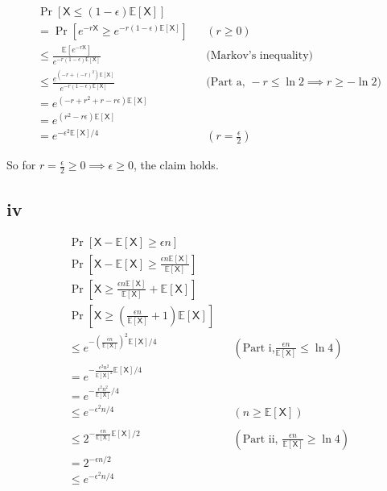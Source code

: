\documentclass{article}
\newcommand{\E}{\mathbb{E}}
\newcommand{\rX}{\mathsf{X}}
\begin{document}
\begin{align}
    \Pr[\rX \leq (1-\epsilon)\E[\rX]]  \\
    = \Pr[e^{-r\rX} \geq e^{-r(1-\epsilon)\E[\rX]}] && (r \geq 0) \\
    \leq \frac{\E[e^{-r\rX}]}{e^{-r(1-\epsilon)\E[\rX]}} && \text{(Markov's inequality)} \\
    \leq \frac{e^{(-r+(-r)^2)\E[\rX]}}{e^{-r(1-\epsilon)\E[\rX]}} && \text{({Part
    a, }}-r \leq \ln 2 \implies r \geq -\ln2) \\
    = e^{(-r+r^2 + r - r\epsilon)\E[\rX]} \\
    = e^{(r^2 - r\epsilon)\E[\rX]} \\
    = e^{-\epsilon^2\E[\rX]/4} && (r = \frac{\epsilon}{2})
\end{align}

So for $r = \frac{\epsilon}{2} \geq 0 \implies \epsilon \geq 0$, the claim
holds.

\subsection*{iv}

\begin{align}
    \Pr[\rX - \E[\rX] \geq \epsilon n ]  \\
    \Pr[\rX - \E[\rX] \geq \frac{\epsilon n \E[\rX]}{\E[\rX]}]  \\
    \Pr[\rX \geq \frac{\epsilon n \E[\rX]}{\E[\rX]} + \E[\rX]]  \\
    \Pr[\rX \geq (\frac{\epsilon n}{\E[\rX]} + 1) \E[\rX]]  \\
    \leq e^{-(\frac{\epsilon n}{\E[\rX]})^2 \E[\rX]/4} && (\text{Part i,}
    \frac{\epsilon n}{\E[\rX]} \leq \ln 4)\\
    = e^{-\frac{\epsilon^2 n^2}{\E[\rX]^2} \E[\rX]/4}\\
    = e^{-\frac{\epsilon^2 n^2}{\E[\rX]}/4}\\
    \leq e^{-\epsilon^2 n/4} && (n \geq \E[\rX])\\
    \\
    \leq 2^{-\frac{\epsilon n}{\E[\rX]} \E[\rX]/2} && (\text{Part ii, } \frac{\epsilon
    n}{\E[\rX]} \geq \ln 4)
\\
    = 2^{-\epsilon n /2}\\
    \leq e^{-\epsilon^2 n / 4}\\
\end{align}
\end{document}
